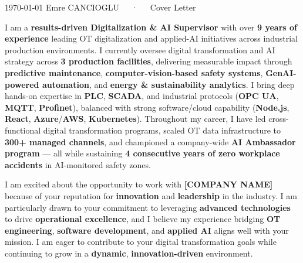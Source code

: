 \documentclass[11pt, a4paper]{awesome-cv}
\newcommand{\ph}[1]{\textcolor{awesome-red}{\bfseries #1}}
\begin{document}
\makecvheader[R]
\vspace{-10mm}

\makecvfooter
  {\today}
  {Emre CANCIOGLU~~~·~~~Cover Letter}
  {}

\makelettertitle


\begin{cvletter}

I am a \textbf{results-driven Digitalization \& AI Supervisor} with over \textbf{9 years of experience} leading OT digitalization and applied-AI initiatives across industrial production environments. I currently oversee digital transformation and AI strategy across \textbf{3 production facilities}, delivering measurable impact through \textbf{predictive maintenance}, \textbf{computer-vision-based safety systems}, \textbf{GenAI-powered automation}, and \textbf{energy \& sustainability analytics}. I bring deep hands-on expertise in \textbf{PLC}, \textbf{SCADA}, and industrial protocols (\textbf{OPC UA}, \textbf{MQTT}, \textbf{Profinet}), balanced with strong software/cloud capability (\textbf{Node.js}, \textbf{React}, \textbf{Azure}/\textbf{AWS}, \textbf{Kubernetes}). Throughout my career, I have led cross-functional digital transformation programs, scaled OT data infrastructure to \textbf{300+ managed channels}, and championed a company-wide \textbf{AI Ambassador program} --- all while sustaining \textbf{4 consecutive years of zero workplace accidents} in AI-monitored safety zones.

\lettersection{Why \ph{[COMPANY NAME]}?}
I am excited about the opportunity to work with \ph{[COMPANY NAME]} because of your reputation for \textbf{innovation} and \textbf{leadership} in the industry. I am particularly drawn to your commitment to leveraging \textbf{advanced technologies} to drive \textbf{operational excellence}, and I believe my experience bridging \textbf{OT engineering}, \textbf{software development}, and \textbf{applied AI} aligns well with your mission. I am eager to contribute to your digital transformation goals while continuing to grow in a \textbf{dynamic}, \textbf{innovation-driven} environment.


\end{cvletter}
\end{document}
